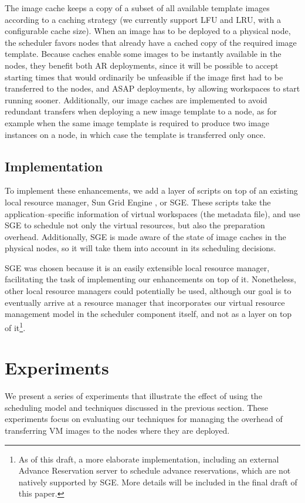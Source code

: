 \documentclass[singlespace]{ccw_chithesis}
\begin{document}
The image cache keeps a copy of a subset of all available template images according to a caching strategy (we currently support LFU and LRU, with a configurable cache size). When an image has to be deployed to a physical node, the scheduler favors nodes that already have a cached copy of the required image template. Because caches enable some images to be instantly available in
the nodes, they benefit both AR deployments, since it will be possible to accept starting times that would ordinarily be unfeasible if the image first had to be transferred to the nodes, and ASAP deployments, by allowing workspaces to start running sooner. Additionally, our image caches are implemented to avoid redundant transfers when deploying a new image template to a node, as for example when the same image template is required to produce two image instances on a node, in which case the template is transferred only once.

\section{Implementation}

To implement these enhancements, we add a layer of scripts on top of an existing local resource manager, Sun Grid Engine
\cite{sgeweb}, or SGE. These scripts take the application--specific information of virtual workspaces (the metadata file), and use SGE to schedule not only the virtual resources, but also the preparation overhead. Additionally, SGE is made aware of the state of image caches in the physical nodes, so it will take them into account in its scheduling decisions.

SGE was chosen because it is an easily extensible local resource manager, facilitating the task of implementing our enhancements on top of it. Nonetheless, other local resource managers could potentially be used, although our goal is to eventually arrive at a resource manager that incorporates our virtual resource management model in the scheduler component itself, and not as a layer on top of it\footnote{As of this draft, a more elaborate implementation, including an external Advance Reservation server to schedule advance reservations, which are not natively supported by SGE. More details will be included in the final draft of this paper.}.


\chapter{Experiments}
\label{cha:experiments}
We present a series of experiments that illustrate the effect of using
the scheduling model and techniques discussed in the previous section.
These experiments focus on evaluating our techniques for managing the
overhead of transferring VM images to the nodes where they are
deployed.
\end{document}
